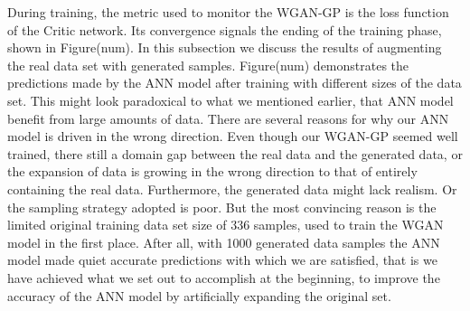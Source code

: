 \documentclass[draft, a4, 10pt, onecolumn]{IEEEtran}
\begin{document}
During training, the metric used to monitor the WGAN-GP is the loss function of the Critic network. Its convergence signals the ending of the training phase, shown in Figure(num).
In this subsection we discuss the results of augmenting the real data set with generated samples. Figure(num) demonstrates the predictions made by the ANN model after training with different sizes of the data set.
This might look paradoxical to what we mentioned earlier, that ANN model benefit from large amounts of data. There are several reasons for why our ANN model is driven in the wrong direction. Even though our WGAN-GP seemed well trained, there still a domain gap between the real data and the generated data, or the expansion of data is growing in the wrong direction to that of entirely containing the real data. Furthermore, the generated data might lack realism. Or the sampling strategy adopted is poor. But the most convincing reason is the limited original training data set size of 336 samples, used to train the WGAN model in the first place. After all, with 1000 generated data samples the ANN model made quiet accurate predictions with which we are satisfied, that is we have achieved what we set out to accomplish at the beginning, to improve the accuracy of the ANN model by artificially expanding the original set.
\end{document}
